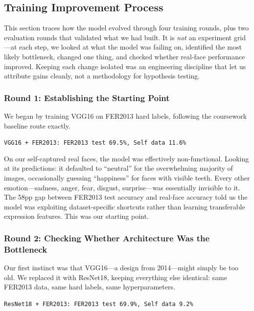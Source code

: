 \documentclass[12pt,a4paper]{article}
\begin{document}
\subsection{Training Improvement Process}

This section traces how the model evolved through four training rounds, plus two evaluation rounds that validated what we had built. It is \emph{not} an experiment grid---at each step, we looked at what the model was failing on, identified the most likely bottleneck, changed one thing, and checked whether real-face performance improved. Keeping each change isolated was an engineering discipline that let us attribute gains cleanly, not a methodology for hypothesis testing.

\subsubsection*{Round 1: Establishing the Starting Point}

We began by training VGG16 on FER2013 hard labels, following the coursework baseline route exactly.

\begin{center}
\texttt{VGG16 + FER2013: FER2013 test 69.5\%, Self data 11.6\%}
\end{center}

On our self-captured real faces, the model was effectively non-functional. Looking at its predictions: it defaulted to ``neutral'' for the overwhelming majority of images, occasionally guessing ``happiness'' for faces with visible teeth. Every other emotion---sadness, anger, fear, disgust, surprise---was essentially invisible to it. The 58pp gap between FER2013 test accuracy and real-face accuracy told us the model was exploiting dataset-specific shortcuts rather than learning transferable expression features. This was our starting point.

\subsubsection*{Round 2: Checking Whether Architecture Was the Bottleneck}

Our first instinct was that VGG16---a design from 2014---might simply be too old. We replaced it with ResNet18, keeping everything else identical: same FER2013 data, same hard labels, same hyperparameters.

\begin{center}
\texttt{ResNet18 + FER2013: FER2013 test 69.9\%, Self data 9.2\%}
\end{center}
\end{document}
